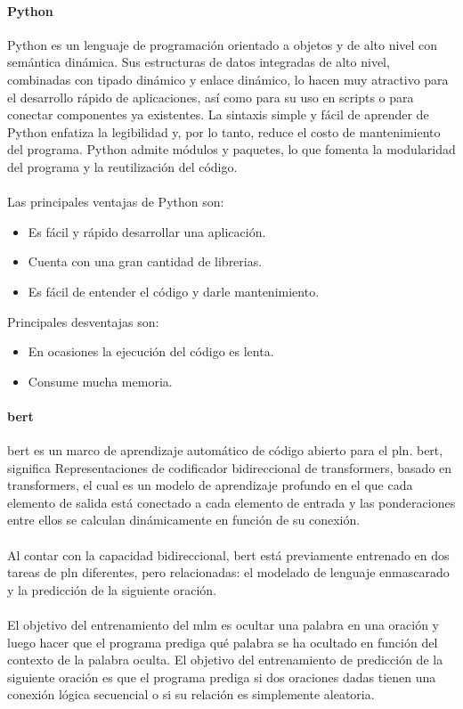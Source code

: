 \documentclass[12pt, a4paper, titlepage]{report}
\begin{document}
			\paragraph{Python \\}
			Python es un lenguaje de programación orientado a objetos y de alto nivel con semántica dinámica. Sus estructuras de datos integradas de alto nivel, combinadas con tipado dinámico y enlace dinámico, lo hacen muy atractivo para el desarrollo rápido de aplicaciones, así como para su uso en scripts o para conectar componentes ya existentes. La sintaxis simple y fácil de aprender de Python enfatiza la legibilidad y, por lo tanto, reduce el costo de mantenimiento del programa. Python admite módulos y paquetes, lo que fomenta la modularidad del programa y la reutilización del código.\cite{refQuesPython}\\\\
			Las principales ventajas de Python son: 
			\begin{itemize}
				\item Es fácil y rápido desarrollar una aplicación.
				\item Cuenta con una gran cantidad de librerias.
				\item Es fácil de entender el código y darle mantenimiento.
			\end{itemize}
			
			Principales desventajas son: 
			\begin{itemize}
				\item En ocasiones la ejecución del código es lenta.
				\item Consume mucha memoria.
			\end{itemize}
			\paragraph{\acrshort{bert} \\}
			\acrfull{bert} es un marco de aprendizaje automático de código abierto para el \acrfull{pln}. \acrshort{bert}, significa Representaciones de codificador bidireccional de transformers, basado en transformers, el cual es un modelo de aprendizaje profundo en el que cada elemento de salida está conectado a cada elemento de entrada y las ponderaciones entre ellos se calculan dinámicamente en función de su conexión. \cite{refQueesBert} \\\\        
			Al contar con  la capacidad bidireccional, \acrshort{bert} está previamente entrenado en dos tareas de \acrshort{pln} diferentes, pero relacionadas: el modelado de lenguaje enmascarado y la predicción de la siguiente oración.\\\\        
			El objetivo del entrenamiento del \acrfull{mlm} es ocultar una palabra en una oración y luego hacer que el programa prediga qué palabra se ha ocultado en función del contexto de la palabra oculta. El objetivo del entrenamiento de predicción de la siguiente oración es que el programa prediga si dos oraciones dadas tienen una conexión lógica secuencial o si su relación es simplemente aleatoria.\par
\end{document}

